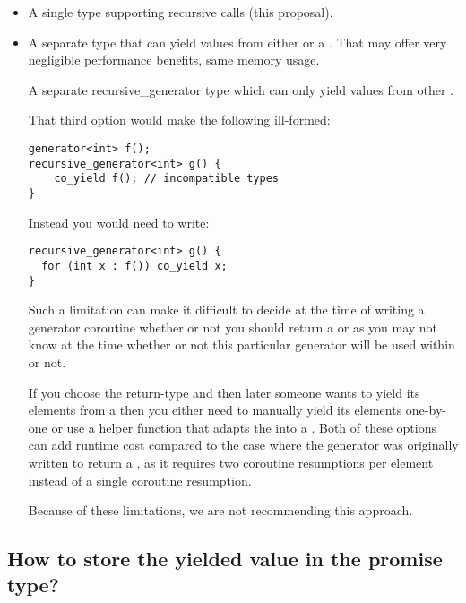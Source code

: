 \documentclass{wg21}
\begin{document}
\begin{itemize}
\item A single  type supporting recursive calls (this proposal).

\item A separate type  that can yield values from either  or a . That may offer very negligible performance benefits, same memory usage.

\tcode A separate {recursive_generator} type which can only yield values from other . 

That third option would make the following ill-formed:

\begin{lstlisting}[style=color]
generator<int> f();
recursive_generator<int> g() {
    co_yield f(); // incompatible types
}
\end{lstlisting}

Instead you would need to write:
\begin{lstlisting}[style=color]
recursive_generator<int> g() {
  for (int x : f()) co_yield x;
}
\end{lstlisting}

Such a limitation can make it difficult to decide at the time of writing a generator
coroutine whether or not you should return a  or 
as you may not know at the time whether or not this particular generator will be used
within  or not.

If you choose the  return-type and then later someone wants to yield its
elements from a  then you either need to manually yield its
elements one-by-one or use a helper function that adapts the  into a
. Both of these options can add runtime cost compared to the
case where the generator was originally written to return a ,
as it requires two coroutine resumptions per element instead of a single coroutine resumption.

Because of these limitations, we are not recommending this approach.
\end{itemize}

\subsection{How to store the yielded value in the promise type?}
\end{document}
